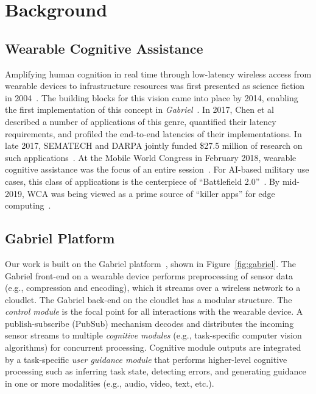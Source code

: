 \chapter{Background}
\label{chapter: background}

\section{Wearable Cognitive Assistance}

Amplifying human cognition in real time through low-latency wireless
access from wearable devices to infrastructure resources was first
presented as science fiction in 2004~\cite{Satya2004}.  The building
blocks for this vision came into place by 2014, enabling the first
implementation of this concept in {\em Gabriel}~\cite{Ha2014}. In
2017, Chen et al~\cite{Chen2017} described a number of applications of
this genre, quantified their latency requirements, and profiled the
end-to-end latencies of their implementations.  In late 2017, SEMATECH
and DARPA jointly funded \$27.5 million of research on such
applications~\cite{Oakley2018, Stokes2018}.  At the Mobile World
Congress in February 2018, wearable cognitive assistance was the focus
of an entire session~\cite{Ray2018}.  For AI-based military use cases,
this class of applications is the centerpiece of ``Battlefield
2.0''~\cite{Doffman2018}.  By mid-2019, WCA was being viewed as a prime source of ``killer
apps'' for edge computing~\cite{Satya2019b,Satya2019c}.

\section{Gabriel Platform}

Our work is built on the Gabriel platform~\cite{Ha2014,Chen2017},
shown in Figure~\ref{fig:gabriel}.  The Gabriel front-end on a
wearable device performs preprocessing of sensor data (e.g.,
compression and encoding), which it streams over a wireless network
to a cloudlet.  The Gabriel back-end on the cloudlet has a modular structure.
The {\em control module} is the
focal point for all interactions with the wearable device.  A
publish-subscribe (PubSub) mechanism decodes and distributes the
incoming sensor streams to multiple {\em cognitive modules} (e.g.,
task-specific computer vision algorithms) for concurrent processing.
Cognitive module outputs are integrated by a task-specific {\em user
  guidance module} that performs higher-level cognitive processing
such as inferring task state, detecting errors, and
generating guidance in one or more modalities (e.g., audio, video, text, etc.).

